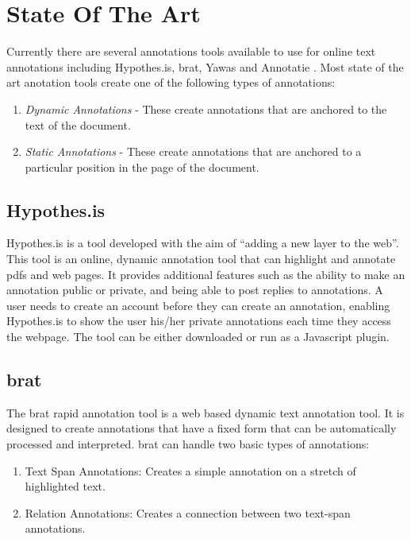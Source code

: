 \section{State Of The Art}
	Currently there are several annotations tools available to use for online text annotations including Hypothes.is, brat, Yawas and Annotatie \cite{stateOfTheArt}. Most state of the art anotation tools create one of the following types of annotations: 
	  \begin{enumerate}
	    \item \textit{Dynamic Annotations} - These create annotations that are anchored to the text of the document.
	    \item \textit{Static Annotations} - These create annotations that are anchored to a particular position in the page of the document.
	  \end{enumerate}

	\subsection{Hypothes.is}
    	Hypothes.is \cite{hypothesis} is a tool developed with the aim of ``adding a new layer to the web''. This tool is an online, dynamic annotation tool that can highlight and annotate pdfs and web pages. It provides additional features such as the ability to make an annotation public or private, and being able to post replies to annotations. A user needs to create an account before they can create an annotation, enabling Hypothes.is to show the user his/her private annotations each time they access the webpage. The tool can be either downloaded or run as a Javascript plugin.    

    \subsection{brat}
	    The brat rapid annotation tool \cite{brat} is a web based dynamic text annotation tool. It is designed to create annotations that have a fixed form that can be automatically processed and interpreted. brat can handle two basic types of annotations:
	    \begin{enumerate}
	      \item Text Span Annotations: Creates a simple annotation on a stretch of highlighted text.
	      \item Relation Annotations: Creates a connection between two text-span annotations.
	    \end{enumerate}

